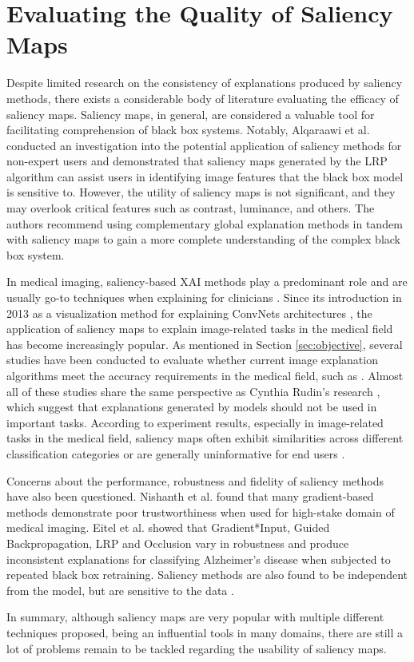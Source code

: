 \section{Evaluating the Quality of Saliency Maps}
\label{sec:evaluatingQualitySaliencyMaps}
Despite limited research on the consistency of explanations produced by saliency methods, there exists a considerable body of literature evaluating the efficacy of saliency maps. Saliency maps, in general, are considered a valuable tool for facilitating comprehension of black box systems. Notably, Alqaraawi et al. \cite{evaluatingSaliencyMaps} conducted an investigation into the potential application of saliency methods for non-expert users and demonstrated that saliency maps generated by the LRP algorithm can assist users in identifying image features that the black box model is sensitive to. However, the utility of saliency maps is not significant, and they may overlook critical features such as contrast, luminance, and others. The authors recommend using complementary global explanation methods in tandem with saliency maps to gain a more complete understanding of the complex black box system.

In medical imaging, saliency-based XAI methods play a predominant role \cite{xaiInMedicalImaging} and are usually go-to techniques when explaining for clinicians \cite{xaiInMedicalSurvey}. Since its introduction in 2013 as a visualization method for explaining ConvNets architectures \cite{saliencyMaps}, the application of saliency maps to explain image-related tasks in the medical field has become increasingly popular. As mentioned in Section \ref{sec:objective}, several studies have been conducted to evaluate whether current image explanation algorithms meet the accuracy requirements in the medical field, such as \cite{assistGrading, trustworthiness, fulfillRequirements}. Almost all of these studies share the same perspective as Cynthia Rudin's research \cite{xaiInMedicalSurvey}, which suggest that explanations generated by models should not be used in important tasks. According to experiment results, especially in image-related tasks in the medical field, saliency maps often exhibit similarities across different classification categories or are generally uninformative for end users \cite{xaiNotProvided}.

Concerns about the performance, robustness and fidelity of saliency methods have also been questioned. Nishanth et al. \cite{trustworthiness} found that many gradient-based methods demonstrate poor trustworthiness when used for high-stake domain of medical imaging. Eitel et al. \cite{testingAttributionMethodsRobustness} showed that Gradient*Input, Guided Backpropagation, LRP and Occlusion vary in robustness and produce inconsistent explanations for classifying Alzheimer's disease when subjected to repeated black box retraining. Saliency methods are also found to be independent from the model, but are sensitive to the data \cite{sanityCheck, interpretationOfNeuralNetworksIsFragile, unreliabilityOfSaliencyMethods}.

In summary, although saliency maps are very popular with multiple different techniques proposed, being an influential tools in many domains, there are still a lot of problems remain to be tackled regarding the usability of saliency maps.